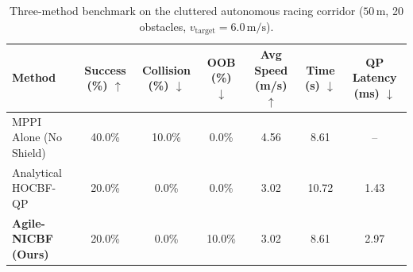 \begin{table}[t]
\centering
\caption{Three-method benchmark on the cluttered autonomous racing corridor ($50\,\mathrm{m}$, 20 obstacles, $v_{\mathrm{target}}=6.0\,\mathrm{m/s}$).}
\label{tab:benchmark_results}
\begin{tabular}{lcccccc}
\toprule
\textbf{Method} & \textbf{Success (\%)} $\uparrow$ & \textbf{Collision (\%)} $\downarrow$ & \textbf{OOB (\%)} $\downarrow$ & \textbf{Avg Speed (m/s)} $\uparrow$ & \textbf{Time (s)} $\downarrow$ & \textbf{QP Latency (ms)} $\downarrow$ \\
\midrule
MPPI Alone (No Shield) & 40.0\% & 10.0\% & 0.0\% & 4.56 & 8.61 & -- \\
Analytical HOCBF-QP & 20.0\% & 0.0\% & 0.0\% & 3.02 & 10.72 & 1.43 \\
\textbf{Agile-NICBF (Ours)} & 20.0\% & 0.0\% & 10.0\% & 3.02 & 8.61 & 2.97 \\
\bottomrule
\end{tabular}
\end{table}